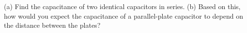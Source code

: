         (a) Find the capacitance of two identical capacitors in
        series. \hwendpart
        (b) Based on this, how would you expect the
        capacitance of a parallel-plate capacitor to depend on the
        distance between the plates?
